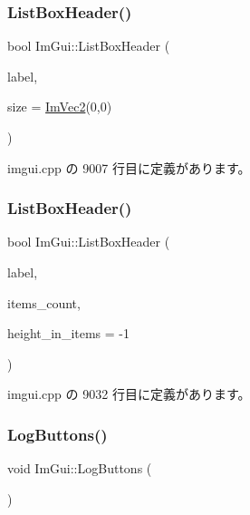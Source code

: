 \subsubsection{\texorpdfstring{List\+Box\+Header()}{ListBoxHeader()}\hspace{0.1cm}{\footnotesize\ttfamily [1/2]}}
{\footnotesize\ttfamily bool Im\+Gui\+::\+List\+Box\+Header (\begin{DoxyParamCaption}\item[{const char $\ast$}]{label,  }\item[{const \mbox{\hyperlink{struct_im_vec2}{Im\+Vec2}} \&}]{size = {\ttfamily \mbox{\hyperlink{struct_im_vec2}{Im\+Vec2}}(0,0)} }\end{DoxyParamCaption})}



 imgui.\+cpp の 9007 行目に定義があります。

\mbox{\label{namespace_im_gui_a6c5c48e5e5b90365f3f6faaa3307af26}} 
\subsubsection{\texorpdfstring{List\+Box\+Header()}{ListBoxHeader()}\hspace{0.1cm}{\footnotesize\ttfamily [2/2]}}
{\footnotesize\ttfamily bool Im\+Gui\+::\+List\+Box\+Header (\begin{DoxyParamCaption}\item[{const char $\ast$}]{label,  }\item[{int}]{items\+\_\+count,  }\item[{int}]{height\+\_\+in\+\_\+items = {\ttfamily -\/1} }\end{DoxyParamCaption})}



 imgui.\+cpp の 9032 行目に定義があります。

\mbox{\label{namespace_im_gui_a7bd295da4be19bab98262c76fcaeb4fb}} 
\subsubsection{\texorpdfstring{Log\+Buttons()}{LogButtons()}}
{\footnotesize\ttfamily void Im\+Gui\+::\+Log\+Buttons (\begin{DoxyParamCaption}{ }\end{DoxyParamCaption})}



